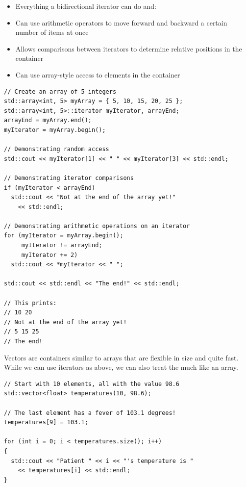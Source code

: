 
\begin{itemize}
	\item Everything a bidirectional iterator can do and:
	\item Can use arithmetic operators to move forward and backward a certain number of items at once
	\item Allows comparisons between iterators to determine relative positions in the container
	\item Can use array-style access to elements in the container
\end{itemize}

\noindent\begin{minipage}{\linewidth}\begin{lstlisting}
// Create an array of 5 integers
std::array<int, 5> myArray = { 5, 10, 15, 20, 25 };
std::array<int, 5>::iterator myIterator, arrayEnd;
arrayEnd = myArray.end();
myIterator = myArray.begin();

// Demonstrating random access
std::cout << myIterator[1] << " " << myIterator[3] << std::endl;

// Demonstrating iterator comparisons
if (myIterator < arrayEnd)
  std::cout << "Not at the end of the array yet!"
    << std::endl;

// Demonstrating arithmetic operations on an iterator
for (myIterator = myArray.begin();
     myIterator != arrayEnd;
     myIterator += 2)
  std::cout << *myIterator << " ";

std::cout << std::endl << "The end!" << std::endl;

// This prints:
// 10 20
// Not at the end of the array yet!
// 5 15 25
// The end!
\end{lstlisting}\end{minipage}


Vectors are containers similar to arrays that are flexible in size and quite fast. 
While we can use iterators as above, we can also treat the  much like an array.

\noindent\begin{minipage}{\linewidth}\begin{lstlisting}
// Start with 10 elements, all with the value 98.6
std::vector<float> temperatures(10, 98.6); 

// The last element has a fever of 103.1 degrees!
temperatures[9] = 103.1; 

for (int i = 0; i < temperatures.size(); i++)
{
  std::cout << "Patient " << i << "'s temperature is " 
    << temperatures[i] << std::endl;
}
\end{lstlisting}\end{minipage}

